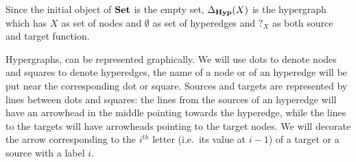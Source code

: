 \documentclass[runningheads,envcountsect]{llncs}
\newcommand{\catname}[1]{\textbf{\textup{#1}}}
\newcommand{\hyp}{\catname{Hyp}}
\begin{document}
\begin{remark}Since the initial object of $\catname{Set}$ is the empty set,  $\Delta_{\hyp}(X)$ is the hypergraph which has $X$ as set of nodes and $\emptyset$ as set of hyperedges and $?_X$ as both source and target function.
\end{remark}


Hypergraphs,  can be represented graphically. We will use dots to denote nodes and squares to denote hyperedges, the name of a node or of an hyperedge will be put near the corresponding dot or square. Sources and targets are represented by lines between dots and squares: the lines from the sources of an hyperedge will have an arrowhead in the middle pointing towards the hyperedge, while the lines to the targets will have arrowheads pointing to the target nodes.  We will decorate the arrow corresponding to the $i^{th}$ letter (i.e.~its value at $i-1$) of a target or a source with a label $i$.
\end{document}
